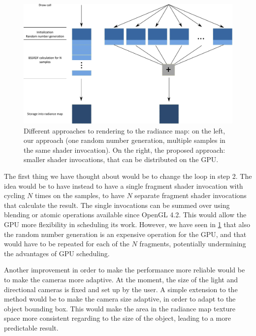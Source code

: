 \begin{figure}[!h]
\centering
\includegraphics[width=0.7 \linewidth]{images/method/extension_shader.pdf}
\caption{Different approaches to rendering to the radiance map: on the left, our approach (one random number generation, multiple samples in the same shader invocation). On the right, the proposed approach: smaller shader invocations, that can be distributed on the GPU.}
\label{fig:shaderimprov}
\end{figure}

The first thing we have thought about would be to change the loop in step 2. The idea would be to have instead to have a single fragment shader invocation with cycling $N$ times on the samples, to have $N$ separate fragment shader invocations that calculate the result. The single invocations can be summed over using blending or atomic operations available since OpenGL 4.2. This would allow the GPU more flexibility in scheduling its work. However, we have seen in \ref{fig:shaderimprov} that also the random number generation is an expensive operation for the GPU, and that would have to be repeated for each of the $N$ fragments, potentially undermining the advantages of GPU scheduling. 

Another improvement in order to make the performance more reliable would be to make the cameras more adaptive. At the moment, the size of the light and directional cameras is fixed and set up by the user. A simple extension to the method would be to make the camera size adaptive, in order to adapt to the object bounding box. This would make the area in the radiance map texture space more consistent regarding to the size of the object, leading to a more predictable result. 

